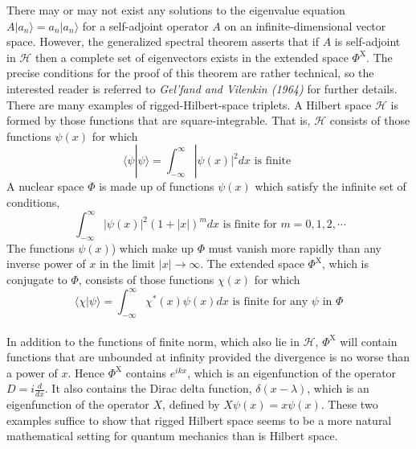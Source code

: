 \noindent
There may or may not exist any solutions to the eigenvalue equation $A|a_n\rangle = a_n |a_n\rangle$ for a self-adjoint operator $A$ on an infinite-dimensional vector space. However, the generalized spectral theorem asserts that if $A$ is self-adjoint in $\mathcal{H}$ then a complete set of eigenvectors exists in the extended space $\Phi^{\mathrm{X}}$. The precise conditions for the proof of this theorem are rather technical, so the interested reader is referred to \emph{Gel'fand and Vilenkin (1964)} for further details.
\\
There are many examples of rigged-Hilbert-space triplets. A Hilbert space $\mathcal{H}$ is formed by those functions that are square-integrable. That is, $\mathcal{H}$ consists of those functions $\psi(x)$ for which
\[\langle \psi | \psi \rangle = \int_{-\infty}^{\infty} |\psi(x)|^2 dx \mbox{ is finite }\]
A nuclear space $\Phi$ is made up of functions $\psi(x)$ which satisfy the infinite set of conditions,
\[\ \int_{-\infty}^{\infty} |\psi(x)|^2(1+|x|)^m dx \mbox{ is finite for } m = 0,1,2,\cdots\]
The functions $\psi(x)$) which make up $\Phi$ must vanish more rapidly than any inverse power of $x$ in the limit $|x| \to \infty$. The extended space $\Phi^{\mathrm{X}}$, which is conjugate to $\Phi$, consists of those functions $\chi(x)$ for which
\[\langle \chi | \psi \rangle = \int_{-\infty}^{\infty} \chi^*(x)\psi(x) dx \mbox{ is finite for any } \psi \mbox{ in } \Phi\]
\\
In addition to the functions of finite norm, which also lie in $\mathcal{H}$, $\Phi^{\mathrm{X}}$ will contain functions that are unbounded at infinity provided the divergence is no worse than a power of $x$. Hence $\Phi^{\mathrm{X}}$ contains $e^{ikx}$, which is an eigenfunction
of the operator $D = i \frac{d}{dx}$. It also contains the Dirac delta function, $\delta(x-\lambda)$, which is an eigenfunction of the operator $X$, defined by $X\psi(x) = x\psi(x)$.
These two examples suffice to show that rigged Hilbert space seems to be a more natural mathematical setting for quantum mechanics than is Hilbert space.

